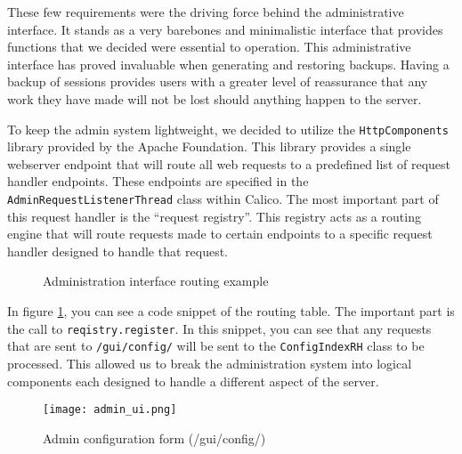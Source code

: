 These few requirements were the driving force behind the administrative interface. It stands as a very barebones and minimalistic interface that provides functions that we decided were essential to operation. This administrative interface has proved invaluable when generating and restoring backups. Having a backup of sessions provides users with a greater level of reassurance that any work they have made will not be lost should anything happen to the server.

% 
To keep the admin system lightweight, we decided to utilize the \texttt{HttpComponents} library provided by the Apache Foundation\cite{apache:http}. This library provides a single webserver endpoint that will route all web requests to a predefined list of request handler endpoints. These endpoints are specified in the \texttt{AdminRequestListenerThread} class within Calico. The most important part of this request handler is the ``request registry''. This registry acts as a routing engine that will route requests made to certain endpoints to a specific request handler designed to handle that request.

\begin{figure}[htb]
  \centering
  \small
  
  \normalsize
  \caption{Administration interface routing example}
  \label{code:request_registry}
\end{figure}

In figure \ref{code:request_registry}, you can see a code snippet of the routing table. The important part is the call to \texttt{reqistry.register}. In this snippet, you can see that any requests that are sent to \texttt{/gui/config/} will be sent to the \texttt{ConfigIndexRH} class to be processed. This allowed us to break the administration system into logical components each designed to handle a different aspect of the server. 

\begin{figure}[htb]
  \centering
  \texttt{[image: admin\_ui.png]}
  \caption{Admin configuration form (/gui/config/)}
  \label{fig:admin_config}
\end{figure}

